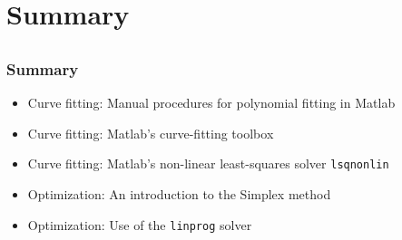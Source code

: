 \section{Summary}
\subsection*{}
\begin{frame}
  \frametitle{Summary}
  \begin{itemize}
    \item Curve fitting: Manual procedures for polynomial fitting in Matlab
    \item Curve fitting: Matlab's curve-fitting toolbox
    \item Curve fitting: Matlab's non-linear least-squares solver \lstinline$lsqnonlin$
    \item Optimization: An introduction to the Simplex method
    \item Optimization: Use of the \lstinline$linprog$ solver
  \end{itemize}

\end{frame}
